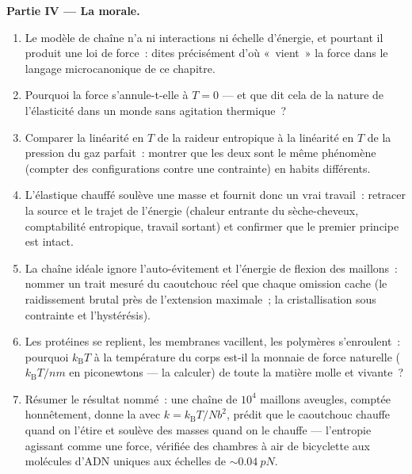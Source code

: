 \begin{problem}
\medskip\noindent\textbf{Partie IV --- La morale.}
\begin{enumerate}[resume]
  \item Le modèle de chaîne n'a ni interactions ni échelle d'énergie,
        et pourtant il produit une loi de force~: dites précisément
        d'où «~vient~» la force dans le langage microcanonique de ce
        chapitre.
  \item Pourquoi la force s'annule-t-elle à $T = 0$ --- et que dit
        cela de la nature de l'élasticité dans un monde sans agitation
        thermique~?
  \item Comparer la linéarité en $T$ de la raideur entropique à la
        linéarité en $T$ de la pression du gaz parfait~: montrer que
        les deux sont le
        même phénomène (compter des configurations contre une
        contrainte) en habits différents.
  \item L'élastique chauffé soulève une masse et fournit donc un vrai
        travail~: retracer la source et le trajet de l'énergie
        (chaleur entrante du sèche-cheveux, comptabilité entropique,
        travail sortant) et confirmer que le premier principe est
        intact.
  \item La chaîne idéale ignore l'auto-évitement et l'énergie de
        flexion des maillons~: nommer un trait mesuré du caoutchouc
        réel que chaque omission cache (le raidissement brutal près de
        l'extension maximale~; la cristallisation sous contrainte et
        l'hystérésis).
  \item Les protéines se replient, les membranes vacillent, les
        polymères s'enroulent~: pourquoi $k_{\text{B}}T$ à la
        température du corps est-il la monnaie de force naturelle
        ($k_{\text{B}}T/\unit{nm}$ en piconewtons --- la calculer) de
        toute la matière molle et vivante~?
  \item Résumer le résultat nommé~: une chaîne de $10^4$ maillons
        aveugles, comptée honnêtement, donne la  avec $k =
        k_{\text{B}}T/Nb^2$, prédit que le caoutchouc chauffe quand on
        l'étire et soulève des masses quand on le chauffe ---
        l'entropie agissant comme une force, vérifiée des chambres à
        air de bicyclette aux molécules d'ADN uniques aux échelles de
        $\sim\qty{0.04}{pN}$.
\end{enumerate}
\end{problem}
